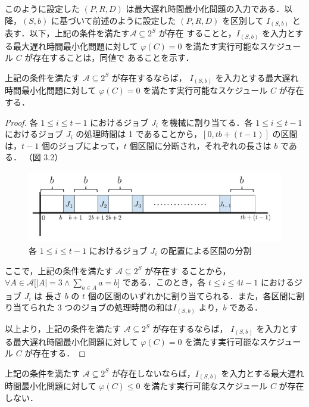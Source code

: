 \documentclass[12pt]{optlab-bachelor}
\begin{document}
このように設定した $(P,R,D)$ は最大遅れ時間最小化問題の入力である．以
降，$(S,b)$ に基づいて前述のように設定した $(P,R,D)$ を区別して
$I_{(S,b)}$ と表す．以下，上記の条件を満たす$\mathcal{A} \subseteq 2^S$ が存在
することと，$I_{(S,b)}$ を入力とする最大遅れ時間最小化問題に対して
$\varphi(C) =  0$
を満たす実行可能なスケジュール $C$ が存在することは，同値で
あることを示す．
\begin{lemma}\label{l_3}
  上記の条件を満たす $\mathcal{A} \subseteq 2^S$ が存在するならば，
  $I_{(S,b)}$ を入力とする最大遅れ時間最小化問題に対して $\varphi(C) =
  0$ を満たす実行可能なスケジュール $C$ が存在する．
\end{lemma}

\begin{proof}
  各 $1 \le i \le t - 1$ におけるジョブ $J_i$ を機械に割り当てる．各 $1 \le i \le t - 1$ におけるジョブ $J_i$ の処理時間は 1 であることから，$[0, tb + (t - 1)]$ の区間は，$t - 1$ 個のジョブによって，$t$ 個区間に分断され，それぞれの長さは $b$ である．
  （図 3.2）
  \begin{figure}[h]
    \centering
    \includegraphics[width = 14cm]{figure/Lmax.pdf}
    \caption{各 $1 \le i \le t - 1$ におけるジョブ $J_i$ の配置による区間の分割}
  \end{figure}

  ここで，上記の条件を満たす $\mathcal{A} \subseteq 2^S$ が存在す
  ることから，$\forall A \in \mathcal{A}\big[|A| = 3 \land \sum_{a \in
  A}a = b \big]$ である．このとき，各 $t \le i \le 4t - 1$ におけるジョブ $J_{i}$ は 長さ $b$ の $t$ 個の区間のいずれかに割り当てられる．また，各区間に割り当てられた 3 つのジョブの処理時間の和は$I_{(S,b)}$ より，$b$ である．

  以上より，上記の条件を満たす $\mathcal{A} \subseteq 2^S$ が存在するならば，
  $I_{(S,b)}$ を入力とする最大遅れ時間最小化問題に対して $\varphi(C) =
  0$ を満たす実行可能なスケジュール $C$ が存在する．
\end{proof}

\begin{lemma}\label{l_4}
  上記の条件を満たす $\mathcal{A} \subseteq 2^S$ が存在しないならば，$I_{(S,b)}$ を入力とする最大遅れ時間最小化問題に対して $\varphi(C) \le
  0$ を満たす実行可能なスケジュール $C$ が存在しない．
\end{lemma}
\end{document}
